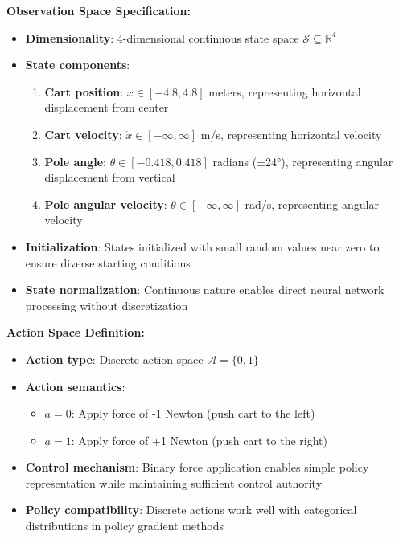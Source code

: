\documentclass[12pt]{article}
\begin{document}
{{{\textbf{Observation Space Specification:}
\begin{itemize}
    \item \textbf{Dimensionality}: 4-dimensional continuous state space $\mathcal{S} \subseteq \mathbb{R}^4$
    \item \textbf{State components}:
    \begin{enumerate}
        \item \textbf{Cart position}: $x \in [-4.8, 4.8]$ meters, representing horizontal displacement from center
        \item \textbf{Cart velocity}: $\dot{x} \in [-\infty, \infty]$ m/s, representing horizontal velocity
        \item \textbf{Pole angle}: $\theta \in [-0.418, 0.418]$ radians (±24°), representing angular displacement from vertical
        \item \textbf{Pole angular velocity}: $\dot{\theta} \in [-\infty, \infty]$ rad/s, representing angular velocity
    \end{enumerate}
    \item \textbf{Initialization}: States initialized with small random values near zero to ensure diverse starting conditions
    \item \textbf{State normalization}: Continuous nature enables direct neural network processing without discretization
\end{itemize}

\textbf{Action Space Definition:}
\begin{itemize}
    \item \textbf{Action type}: Discrete action space $\mathcal{A} = \{0, 1\}$
    \item \textbf{Action semantics}: 
    \begin{itemize}
        \item $a = 0$: Apply force of -1 Newton (push cart to the left)
        \item $a = 1$: Apply force of +1 Newton (push cart to the right)
    \end{itemize}
    \item \textbf{Control mechanism}: Binary force application enables simple policy representation while maintaining sufficient control authority
    \item \textbf{Policy compatibility}: Discrete actions work well with categorical distributions in policy gradient methods
\end{itemize}

}}}
\end{document}
